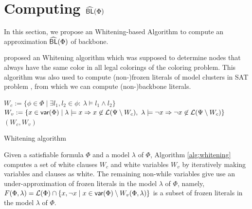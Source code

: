 \section{Computing ${\sf \widehat{BL}}(\Phi)$}
In this section, we propose an Whitening-based Algorithm to compute an approximation ${\sf \widehat{BL}}(\Phi)$ of backbone.

\cite{Par03} proposed an Whitening algorithm which was supposed to determine nodes that always have the same color in all legal colorings of the coloring problem.
This algorithm was also used to compute (non-)frozen literals of model clusters in SAT problem \cite{LMZ09}, from which we can compute (non-)backbone literals.


\begin{algorithm}
\SetAlgoShortEnd
\SetFillComment
{}
$W_c:= \{\phi\in\Phi \mid \exists l_1,l_2\in\phi: \  \lambda\models l_1\wedge l_2\}$\;
$W_v:=\{x\in \textsf{var}(\Phi)\mid \lambda\models x\Rightarrow x\not\in {\cal L}(\Psi\setminus W_c),
        \ \lambda\models \neg x\Rightarrow \neg x\not\in {\cal L}(\Psi\setminus W_c)\}$\;
\Return $(W_c, W_v)$\;
\caption{Whitening algorithm}
\label{alg:whitening}
\end{algorithm}

Given a satisfiable formula $\Phi$ and a model $\lambda$ of $\Phi$,
Algorithm \ref{alg:whitening} computes a set of white clauses $W_c$ and white variables $W_v$ by iteratively making variables and clauses as white.
The remaining non-while variables give use an under-approximation of frozen literals in the model $\lambda$ of $\Phi$, namely,
$F(\Phi,\lambda)={\cal L}(\Phi)\cap \{x,\neg x\mid x\in \textsf{var}(\Phi)\setminus W_v(\Phi,\lambda)\}$ is a subset of frozen literals in the model $\lambda$ of $\Phi$.



